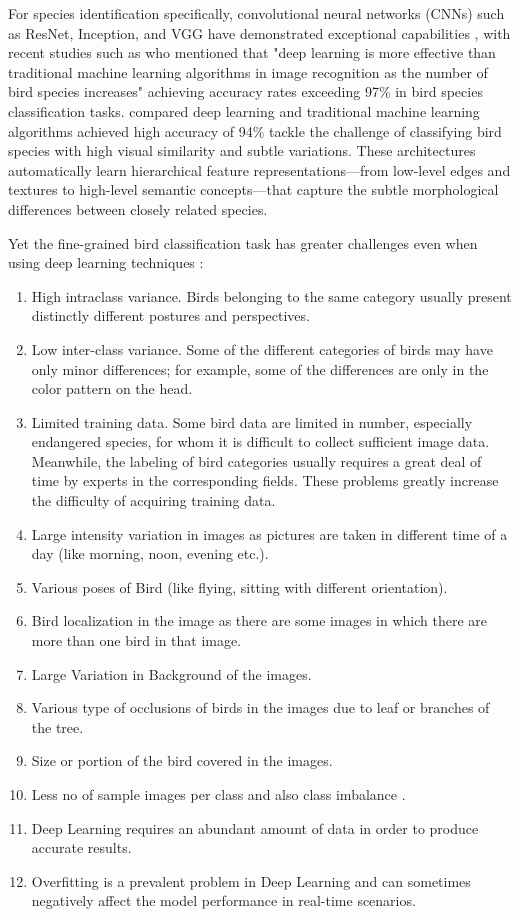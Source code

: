 \documentclass[a4paper,12pt]{report}
\begin{document}
For species identification specifically, convolutional neural networks (CNNs) such as ResNet, Inception, and VGG have demonstrated exceptional capabilities \cite{essay101313}, with recent studies such as \citep{transferln97} who mentioned that "deep learning is more effective than traditional machine learning algorithms in image recognition as the number of bird species increases" achieving accuracy rates exceeding 97\% in bird species classification tasks. \citep{ALFATEMI2024558} compared deep learning and traditional machine learning algorithms achieved high accuracy of 94\% tackle the challenge of classifying bird species with high visual similarity and subtle variations. These architectures automatically learn hierarchical feature representations—from low-level edges and textures to high-level semantic concepts—that capture the subtle morphological differences between closely related species.

Yet the fine-grained bird classification task has greater challenges even when using deep learning techniques \cite{source3} \citep{ani13020264}:
\begin{enumerate}
    \item High intraclass variance. Birds belonging to the same category usually present distinctly different postures and perspectives.
    \item Low inter-class variance. Some of the different categories of birds may have only minor differences; for example, some of the differences are only in the color pattern on the head.
    \item Limited training data. Some bird data are limited in number, especially endangered species, for whom it is difficult to collect sufficient image data. Meanwhile, the labeling of bird categories usually requires a great deal of time by experts in the corresponding fields. These problems greatly increase the difficulty of acquiring training data.
    \item Large intensity variation in images as pictures are taken in different time of a day (like morning, noon, evening etc.).
    \item Various poses of Bird (like flying, sitting with different orientation).
    \item Bird localization in the image as there are some images in which there are more than one bird in that image.
    \item Large Variation in Background of the images.
    \item Various type of occlusions of birds in the images due to leaf or branches of the tree.
    \item Size or portion of the bird covered in the images.
    \item Less no of sample images per class and also class imbalance \citep{10.1007/978-981-15-1387-9_3}.
    \item Deep Learning requires an abundant amount of data in order to produce accurate results.
    \item Overfitting is a prevalent problem in Deep Learning and can sometimes negatively affect the model performance in real-time scenarios.
\end{enumerate}
\end{document}
